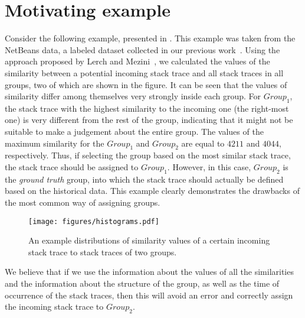 \section{Motivating example}\label{sec:motivation}

Consider the following example, presented in .
This example was taken from the NetBeans data, a labeled dataset collected in our previous work~\cite{s3m}. 
Using the approach proposed by Lerch and Mezini~\cite{lerch}, we calculated the values of the similarity between a potential incoming stack trace and all stack traces in all groups, two of which are shown in the figure. 
It can be seen that the values of similarity differ among themselves very strongly inside each group.
For $Group_1$, the stack trace with the highest similarity to the incoming one (the right-most one) is very different from the rest of the group, indicating that it might not be suitable to make a judgement about the entire group.
The values of the maximum similarity for the $Group_1$ and $Group_2$ are equal to $4211$ and $4044$, respectively.
Thus, if selecting the group based on the most similar stack trace, the stack trace should be assigned to $Group_1$.
However, in this case, $Group_2$ is the \textit{ground truth} group, into which the stack trace should actually be defined based on the historical data.
This example clearly demonstrates the drawbacks of the most common way of assigning groups.

\begin{figure}[t]
\centering
    \texttt{[image: figures/histograms.pdf]}
    \centering
    \vspace{-0.4cm}
    \caption{An example distributions of similarity values of a certain incoming stack trace to stack traces of two groups.}
    \label{fig:hists}
\end{figure}

We believe that if we use the information about the values of all the similarities and the information about the structure of the group, as well as the time of occurrence of the stack traces, then this will avoid an error and correctly assign the incoming stack trace to $Group_2$.
